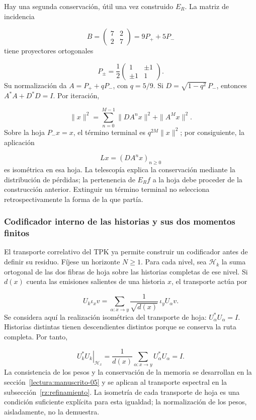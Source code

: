 Hay una segunda conservación, útil una vez construido \(E_R\). La matriz de incidencia

\[
B=\begin{pmatrix}7&2\\2&7\end{pmatrix}=9P_++5P_-
\]
tiene proyectores ortogonales

\[
P_\pm=\frac12
\begin{pmatrix}1&\pm1\\\pm1&1\end{pmatrix}.
\]
Su normalización da \(A=P_++qP_-\), con \(q=5/9\). Si \(D=\sqrt{1-q^2}\,P_-\), entonces \(A^*A+D^*D=I\). Por iteración,

\[
\|x\|^2=\sum_{n=0}^{M-1}\|DA^nx\|^2+\|A^Mx\|^2.
\]
Sobre la hoja \(P_-x=x\), el término terminal es \(q^{2M}\|x\|^2\); por consiguiente, la aplicación

\[
Lx=(DA^nx)_{n\geq0}
\]
es isométrica en esa hoja. La telescopía explica la conservación mediante la distribución de pérdidas; la pertenencia de \(E_Rf\) a la hoja debe proceder de la construcción anterior. Extinguir un término terminal no selecciona retrospectivamente la forma de la que partía.

\subsubsection*{Codificador interno de las historias y sus dos momentos finitos}
El transporte correlativo del TPK ya permite construir un codificador antes de definir su residuo. Fíjese un horizonte \(N\geq1\). Para cada nivel, sea \(\mathscr H_k\) la suma ortogonal de las dos fibras de hoja sobre las historias completas de ese nivel. Si \(d(x)\) cuenta las emisiones salientes de una historia \(x\), el transporte actúa por

\[
U_k\iota_xv=
\sum_{\alpha:x\to y}\frac1{\sqrt{d(x)}}\,\iota_yU_\alpha v.
\]
Se considera aquí la realización isométrica del transporte de hoja: \(U_\alpha^*U_\alpha=I\). Historias distintas tienen descendientes distintos porque se conserva la ruta completa. Por tanto,

\[
\left.U_k^*U_k\right|_{\mathscr H_x}
=\frac1{d(x)}\sum_{\alpha:x\to y}U_\alpha^*U_\alpha=I.
\]
La consistencia de los pesos y la conservación de la memoria se desarrollan en la sección~\ref{lectura:manuscrito-05} y se aplican al transporte espectral en la subsección~\ref{rz:refinamiento}. La isometría de cada transporte de hoja es una condición suficiente explícita para esta igualdad; la normalización de los pesos, aisladamente, no la demuestra.


